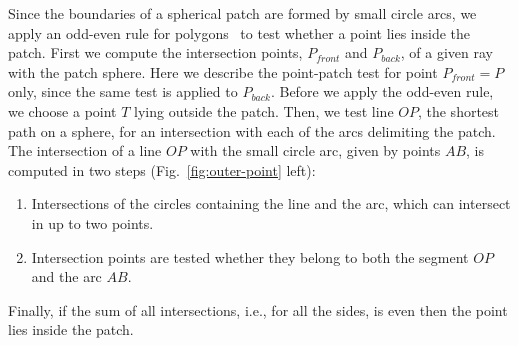 Since the boundaries of a spherical patch are formed by small circle arcs, we apply an odd-even rule for polygons~\cite{shimrat1962algorithm} to test whether a point lies inside the patch. 
First we compute the intersection points, $P_{front}$ and $P_{back}$, of a given ray with the patch sphere.
Here we describe the point-patch test for point $P_{front}=P$ only, since the same test is applied to $P_{back}$.
Before we apply the odd-even rule, we choose a point $T$ lying outside the patch.
Then, we test line $OP$, the shortest path on a sphere, for an intersection with each of the arcs delimiting the patch.
The intersection of a line $OP$ with the small circle arc, given by points $AB$, is computed in two steps (Fig.~\ref{fig:outer-point} left):
\begin{enumerate}
  \item Intersections of the circles containing the line and the arc, which can intersect in up to two points.
  \item Intersection points are tested whether they belong to both the segment $OP$ and the arc $AB$.
\end{enumerate}
Finally, if the sum of all intersections, i.e., for all the sides, is even then the point lies inside the patch.

